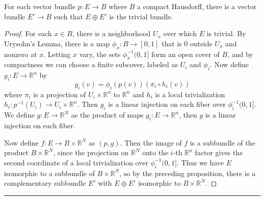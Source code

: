 \begin{prop} For each vector bundle $p:E\rightarrow B$ where $B$ a compact Hausdorff, there is a vector bundle $E'\rightarrow B$ such that $E\oplus E'$ is the trivial bundle.
\end{prop}
\begin{proof}
For each $x\in B$, there is a neighborhood $U_x$ over which $E$ is trivial. By Urysohn's Lemma, there is a map $\phi_x:B\rightarrow [0,1]$ that is $0$ outside $U_x$ and nonzero at $x$. Letting $x$ vary, the sets $\phi_x^{-1}(0,1]$ form an open cover of $B$, and by compactness we can choose a finite subcover, labeled as $U_i$ and $\phi_i$. Now define $g_i:E\rightarrow \mathbb{R}^n$ by
\begin{equation}
g_i(v)=\phi_i(p(v))(\pi_i \circ h_i(v))
\end{equation}
where $\pi_i$ is a projection of $U_i\times \mathbb{R}^n$ to $\mathbb{R}^n$ and $h_i$ is a local trivialization $h_i:p^{-1}(U_i)\rightarrow U_i\times \mathbb{R}^n$. Then $g_i$ is a linear injection on each fiber over $\phi_i^{-1}(0,1]$. We define $g:E\rightarrow \mathbb{R}^N$ as the product of maps $g_i:E\rightarrow \mathbb{R}^n$, then $g$ is a linear injection on each fiber.

Now define $f:E\rightarrow B\times \mathbb{R}^N$ as $(p,g)$. Then the image of $f$ is a subbundle of the product $B\times \mathbb{R}^N$, since the projection on $\mathbb{R}^N$ onto the $i$-th $\mathbb{R}^n$ factor gives the second coordinate of a local trivialization over $\phi_i^{-1}(0,1]$. Thus we have $E$ isomorphic to a subbundle of $B\times \mathbb{R}^N$, so by the preceding proposition, there is a complementary subbundle $E'$ with $E\oplus E'$ isomorphic to $B\times \mathbb{R}^N$.
\end{proof}
\noindent\rule{\textwidth}{1pt}
\newline
